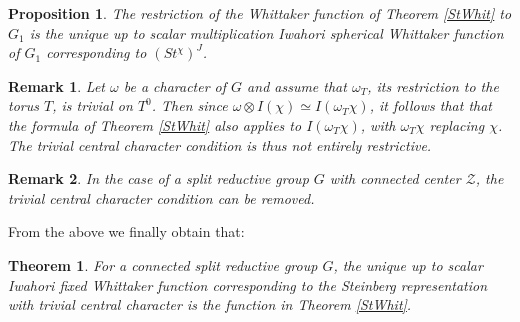 \documentclass{article}
\newtheorem{proposition}{Proposition}
\newtheorem{remark}{Remark}
\newtheorem{theorem}{Theorem}
\begin{document}
\begin{proposition}
        The restriction of the Whittaker function of Theorem \ref{StWhit} to $G_1$ is the unique up to scalar multiplication Iwahori spherical Whittaker function of $G_1$ corresponding to $(St^{\chi})^J$.
\end{proposition}
\begin{remark}
Let $\omega$ be a character of $G$ and assume that $\omega_T$, its restriction to the torus $T$, is trivial on $T^0$. Then since $\omega\otimes I(\chi)\simeq I(\omega_T\chi)$, it follows that that the formula of Theorem \ref{StWhit} also applies to $I(\omega_T\chi)$, with $\omega_T\chi$ replacing $\chi$. The trivial central character condition is thus not entirely restrictive.
\end{remark}
\begin{remark}
    In the case of a split reductive group $G$ with connected center $\mathcal{Z}$, the trivial central character condition can be removed.
\end{remark}
From the above we finally obtain that:
\begin{theorem}
    For a connected split reductive group $G$, the unique up to scalar Iwahori fixed Whittaker function corresponding to the Steinberg representation with trivial central character is the function in Theorem \ref{StWhit}. 
\end{theorem}
\end{document}
